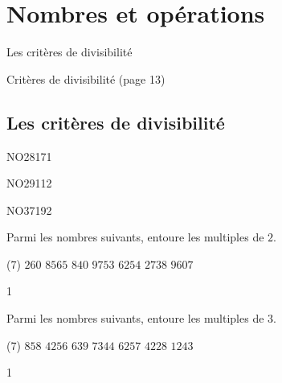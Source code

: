 \documentclass[a4paper,11pt]{report}
\begin{document}
\newcommand{\chapterName}{Nombres et opérations}
\newcommand{\serieName}{Les critères de divisibilité}


\chapter*{\chapterName}
\thispagestyle{empty}

\begin{amL}{\serieName}{
\item Critères de divisibilité (page 13)
}
\end{amL}

\section*{\serieName}
\setcounter{page}{1}
\thispagestyle{firstPage}




\begin{exol}{NO28}{17}{1}
\end{exol}

\begin{exof}{NO29}{11}{2}
\end{exof}

\begin{exol}{NO37}{19}{2}
\end{exol}

\begin{exop}{
    Parmi les nombres suivants, entoure les multiples de $2$.
    \begin{tasks}(7)
\task[] $260$ 
\task[] $8565$ 
\task[] $840$ 
\task[] $9753$ 
\task[] $6254$ 
\task[] $2738$ 
\task[] $9607$
    \end{tasks}
}{1}\end{exop}

\begin{exop}{
    Parmi les nombres suivants, entoure les multiples de $3$. 
    \begin{tasks}(7)
\task[] $858$ 
\task[] $4256$ 
\task[] $639$ 
\task[] $7344$ 
\task[] $6257$ 
\task[] $4228$ 
\task[] $1243$
    \end{tasks}
}{1}\end{exop}
\end{document}
